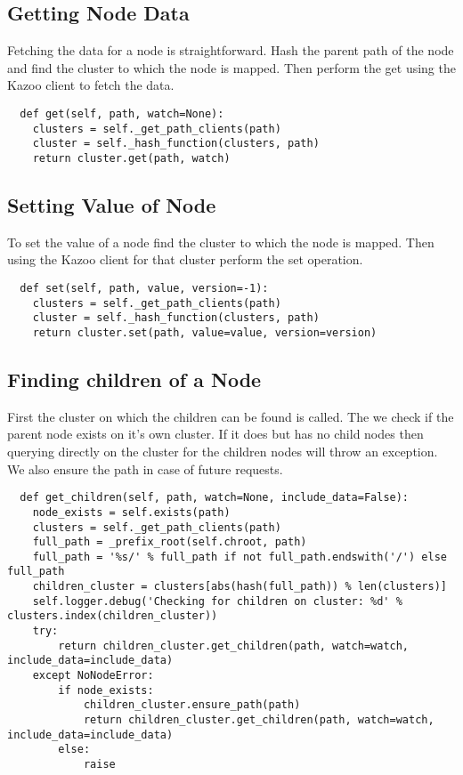 \subsection{Getting Node Data}
Fetching the data for a node is straightforward. Hash the parent path of the node and find the cluster to which the node is mapped. Then perform the get using the Kazoo client to fetch the data.

\begin{lstlisting}
  def get(self, path, watch=None):
    clusters = self._get_path_clients(path)
    cluster = self._hash_function(clusters, path)
    return cluster.get(path, watch)
\end{lstlisting}


\subsection{Setting Value of Node}
To set the value of a node find the cluster to which the node is mapped. Then using the Kazoo client for that cluster perform the set operation. 

\begin{lstlisting}
  def set(self, path, value, version=-1):
    clusters = self._get_path_clients(path)
    cluster = self._hash_function(clusters, path)
    return cluster.set(path, value=value, version=version)
\end{lstlisting}

\subsection{Finding children of a Node}
    First the cluster on which the children can be found is called. The we check if the parent node exists on it's own cluster. If it does but has no child nodes then querying directly on the cluster for the children nodes will throw an exception. We also ensure the path in case of future requests.

\begin{lstlisting}
  def get_children(self, path, watch=None, include_data=False):
    node_exists = self.exists(path)
    clusters = self._get_path_clients(path)
    full_path = _prefix_root(self.chroot, path)
    full_path = '%s/' % full_path if not full_path.endswith('/') else full_path
    children_cluster = clusters[abs(hash(full_path)) % len(clusters)]
    self.logger.debug('Checking for children on cluster: %d' % clusters.index(children_cluster))
    try:
        return children_cluster.get_children(path, watch=watch, include_data=include_data)
    except NoNodeError:
        if node_exists:
            children_cluster.ensure_path(path)
            return children_cluster.get_children(path, watch=watch, include_data=include_data)
        else:
            raise
\end{lstlisting}

